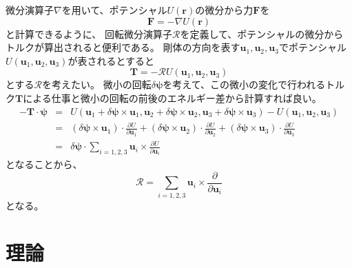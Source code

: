 \documentclass[a4paper,11pt]{jbook}
\def\vecR {\bm {\mathcal {R} } }
\begin{document}
微分演算子$\nabla$を用いて、ポテンシャル$U(\bm{r})$の微分から力$\bm{F}$を
\begin{equation}
\bm{F}=-\nabla U(\bm{r})
\end{equation}
と計算できるように、
回転微分演算子$\vecR$を定義して、ポテンシャルの微分からトルクが算出されると便利である。
剛体の方向を表す$\bm{u}_1,\bm{u}_2,\bm{u}_3$でポテンシャル$U(\bm{u}_1,\bm{u}_2,\bm{u}_3)$が表されるとすると
\begin{equation}
\bm{T}=-\vecR U(\bm{u}_1,\bm{u}_2,\bm{u}_3)
\end{equation}
とする$\vecR$を考えたい。
微小の回転$\delta\bm{\psi}$を考えて、この微小の変化で行われるトルク$\bm{T}$による仕事と微小の回転の前後のエネルギー差から計算すれば良い。
\begin{eqnarray}
-\bm{T}\cdot\bm{\psi}
&=&U(\bm{u}_1+\delta\bm{\psi}\times\bm{u}_1,\bm{u}_2+\delta\bm{\psi}\times\bm{u}_2,\bm{u}_3+\delta\bm{\psi}\times\bm{u}_3)
-U(\bm{u}_1,\bm{u}_2,\bm{u}_3)
\nonumber \\
&=&\left(\delta\bm{\psi}\times\bm{u}_1\right)\cdot\frac{\partial U}{\partial \bm{u}_1}
+\left(\delta\bm{\psi}\times\bm{u}_2\right)\cdot\frac{\partial U}{\partial \bm{u}_2}
+\left(\delta\bm{\psi}\times\bm{u}_3\right)\cdot\frac{\partial U}{\partial \bm{u}_3}\nonumber\\
&=&\delta\bm{\psi}\cdot\sum_{i=1,2,3}\bm{u}_i\times\frac{\partial U}{\partial \bm{u}_i}
\end{eqnarray}
となることから、
\begin{equation}
\vecR=\sum_{i=1,2,3}\bm{u}_i\times\frac{\partial }{\partial \bm{u}_i}
\end{equation}
となる。
\chapter{理論}
\end{document}
